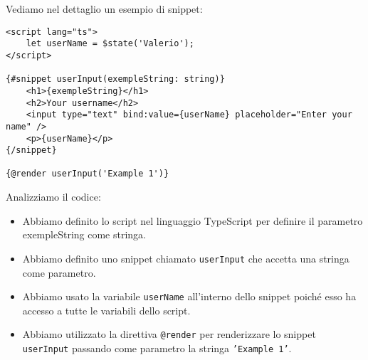 \documentclass[12pt]{article}
\begin{document}
\pagebreak
Vediamo nel dettaglio un esempio di snippet:
\begin{verbatim}
<script lang="ts">
    let userName = $state('Valerio');
</script>

{#snippet userInput(exempleString: string)}
    <h1>{exempleString}</h1>
    <h2>Your username</h2>
    <input type="text" bind:value={userName} placeholder="Enter your name" />
    <p>{userName}</p>
{/snippet}

{@render userInput('Example 1')}
\end{verbatim}
Analizziamo il codice:
\begin{itemize}
    \item Abbiamo definito lo script nel linguaggio TypeScript
    per definire il parametro exempleString come stringa.
    \item Abbiamo definito uno snippet chiamato \texttt{userInput} che accetta
    una stringa come parametro.
    \item Abbiamo usato la variabile \texttt{userName} 
    all'interno dello snippet poiché esso ha accesso a 
    tutte le variabili dello script.
    \item Abbiamo utilizzato la direttiva \texttt{@render} per renderizzare
    lo snippet \texttt{userInput} passando come parametro la stringa \texttt{'Example 1'}.
\end{itemize}
\end{document}
